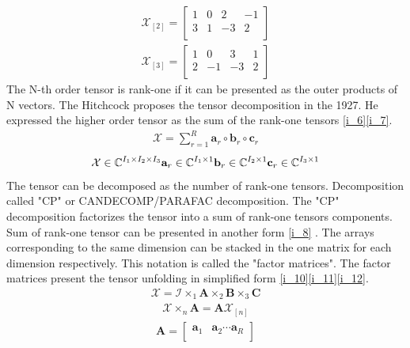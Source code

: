 \begin{align}
\mathcal{X}_{[2]}=\begin{bmatrix}
1&0&2&-1\\ 
3&1&-3&2\\
\end{bmatrix}
\label{i_4}
\end{align}
\begin{align}
\mathcal{X}_{[3]}=\begin{bmatrix}
1&0&3&1\\ 
2&-1&-3&2\\
\end{bmatrix}
\label{i_5}
\end{align}
The N-th order tensor is rank-one if it can be presented as the outer products of N vectors.
The Hitchcock proposes the tensor decomposition  in the 1927. He expressed the higher order tensor as the sum of the rank-one tensors \eqref{i_6}\eqref{i_7}.
\begin{align}
\mathcal{X}=\sum_{r=1}^R \mathbf{a}_r \circ \mathbf{b}_r \circ \mathbf{c}_r
\label{i_6}
\end{align}
\begin{align}
\mathcal{X}\in \mathbb{C}^{I_1\times I_2\times I_3} \mathbf{a}_r\in \mathbb{C}^{I_1\times 1} \mathbf{b}_r\in \mathbb{C}^{I_2\times 1} \mathbf{c}_r\in \mathbb{C}^{I_3\times 1}
\label{i_7}
\end{align}
The  tensor can be decomposed as the number of rank-one tensors. Decomposition called "CP" or CANDECOMP/PARAFAC decomposition\cite{Book6}. The "CP" decomposition factorizes the tensor into a sum of rank-one tensors components. Sum of rank-one tensor can be presented in another form \eqref{i_8} . The arrays corresponding to the same dimension can be stacked in the one matrix for each dimension respectively. This notation is called the "factor matrices". The factor matrices present the tensor unfolding in simplified form \eqref{i_10}\eqref{i_11}\eqref{i_12}.
\begin{align}
\mathcal{X}=\mathcal{I}\times_1 \mathbf{A} \times_2\mathbf{B} \times_3 \mathbf{C}
\label{i_8}
\end{align}
\begin{align}
\mathcal{X}\times_n \mathbf{A}=\mathbf{A}\mathcal{X}_{[n]}
\end{align}
\begin{align}
\mathbf{A}=\begin{bmatrix}
\mathbf{a}_1&\mathbf{a}_2\cdots \mathbf{a}_R\\
\end{bmatrix}
\label{i_9}
\end{align}
